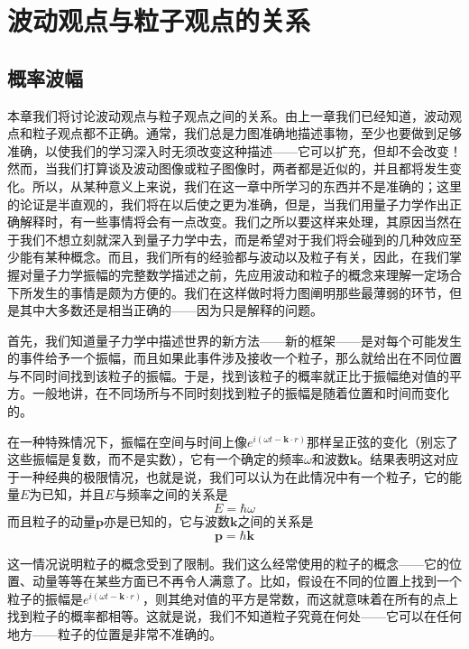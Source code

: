 \chapter{波动观点与粒子观点的关系}

\section{概率波幅}

本章我们将讨论波动观点与粒子观点之间的关系。由上一章我们已经知道，波动观点和粒子观点都不正确。通常，我们总是力图准确地描述事物，至少也要做到足够准确，以使我们的学习深入时无须改变这种描述——它可以扩充，但却不会改变！然而，当我们打算谈及波动图像或粒子图像时，两者都是近似的，并且都将发生变化。所以，从某种意义上来说，我们在这一章中所学习的东西并不是准确的；这里的论证是半直观的，我们将在以后使之更为准确，但是，当我们用量子力学作出正确解释时，有一些事情将会有一点改变。我们之所以要这样来处理，其原因当然在于我们不想立刻就深入到量子力学中去，而是希望对于我们将会碰到的几种效应至少能有某种概念。而且，我们所有的经验都与波动以及粒子有关，因此，在我们掌握对量子力学振幅的完整数学描述之前，先应用波动和粒子的概念来理解一定场合下所发生的事情是颇为方便的。我们在这样做时将力图阐明那些最薄弱的环节，但是其中大多数还是相当正确的——因为只是解释的问题。

首先，我们知道量子力学中描述世界的新方法——新的框架——是对每个可能发生的事件给予一个振幅，而且如果此事件涉及接收一个粒子，那么就给出在不同位置与不同时间找到该粒子的振幅。于是，找到该粒子的概率就正比于振幅绝对值的平方。一般地讲，在不同场所与不同时刻找到粒子的振幅是随着位置和时间而变化的。

在一种特殊情况下，振幅在空间与时间上像$e^{i(\omega t - \boldsymbol{k}\cdot r)}$那样呈正弦的变化（别忘了这些振幅是复数，而不是实数），它有一个确定的频率$\omega$和波数$\boldsymbol{k}$。结果表明这对应于一种经典的极限情况，也就是说，我们可以认为在此情况中有一个粒子，它的能量$E$为已知，并且$E$与频率之间的关系是
\begin{equation}
    \label{Eq:I:38:1}
    E = \hbar \omega
\end{equation}
而且粒子的动量$\boldsymbol{p}$亦是已知的，它与波数$\boldsymbol{k}$之间的关系是
\begin{equation}
    \label{Eq:I:38:2}
    \boldsymbol{p} = \hbar \boldsymbol{k}
\end{equation}

这一情况说明粒子的概念受到了限制。我们这么经常使用的粒子的概念——它的位置、动量等等在某些方面已不再令人满意了。比如，假设在不同的位置上找到一个粒子的振幅是$e^{i(\omega t - \boldsymbol{k}\cdot r)}$，则其绝对值的平方是常数，而这就意味着在所有的点上找到粒子的概率都相等。这就是说，我们不知道粒子究竟在何处——它可以在任何地方——粒子的位置是非常不准确的。

